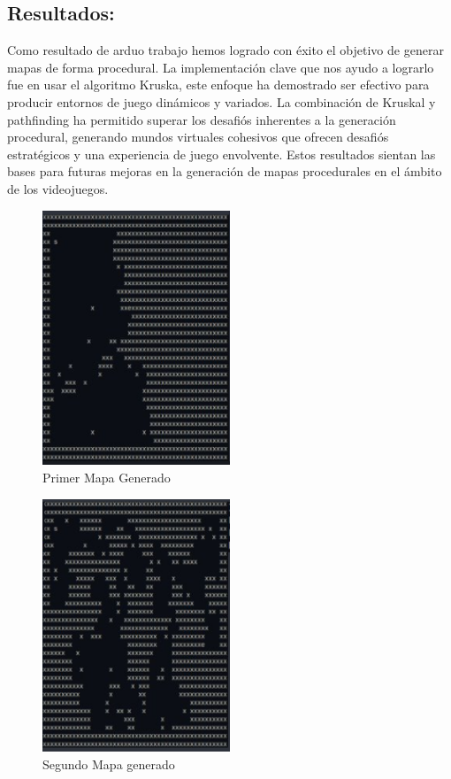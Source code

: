 \documentclass[stu, 12pt, letterpaper, donotrepeattitle, floatsintext, natbib]{apa7}
\begin{document}
\subsection{Resultados:}
Como resultado de arduo trabajo hemos logrado con éxito el objetivo de generar mapas de forma procedural. La implementación clave que nos ayudo a lograrlo fue en usar el algoritmo Kruska, este enfoque ha demostrado ser efectivo para producir entornos de juego dinámicos y variados. La combinación de Kruskal y pathfinding ha permitido superar los desafiós inherentes a la generación procedural, generando mundos virtuales cohesivos que ofrecen desafiós estratégicos y una experiencia de juego envolvente. Estos resultados sientan las bases para futuras mejoras en la generación de mapas procedurales en el ámbito de los videojuegos.
\begin{figure}
    \centering
    \includegraphics[width=0.5\textwidth]{mapa1.PNG}
    \caption{Primer Mapa Generado}
    \label{fig:enter-label}
\end{figure}

\newpage
\begin{figure}
    \centering
    \includegraphics[width=0.5\textwidth]{mapa2.PNG}
    \caption{Segundo Mapa generado}
    \label{fig:enter-label}
\end{figure}
\end{document}
